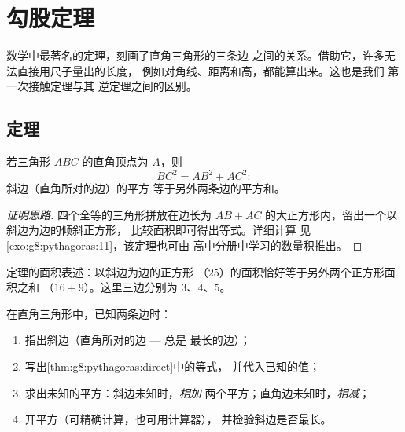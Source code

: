 \chapter{勾股定理}\label{ch:g8:pythagoras}

数学中最著名的定理，刻画了直角三角形的三条边
之间的关系。借助它，许多无法直接用尺子量出的长度，
例如对角线、距离和高，都能算出来。这也是我们
第一次接触定理与其
逆定理之间的区别。

\section{定理}

\begin{theorem}[毕达哥拉斯]\label{thm:g8:pythagoras:direct}
若三角形 $ABC$ 的直角顶点为 $A$，则
\[
BC^2 = AB^2 + AC^2 :
\]
斜边（直角所对的边）的平方
等于另外两条边的平方和。
\end{theorem}

\begin{proof}[证明思路]
四个全等的三角形拼放在边长为
$AB + AC$ 的大正方形内，留出一个以斜边为边的倾斜正方形，
比较面积即可得出等式。详细计算
见\cref{exo:g8:pythagoras:11}，该定理也可由
高中分册中学习的数量积推出。
\end{proof}

\begin{omfigure}

{\small 定理的面积表述：以斜边为边的正方形
（$25$）的面积恰好等于另外两个正方形面积之和
（$16 + 9$）。这里三边分别为 $3$、$4$、$5$。}
\end{omfigure}

\begin{method}[求边长]\label{met:g8:pythagoras:compute}
在直角三角形中，已知两条边时：
\begin{enumerate}
  \item 指出斜边（直角所对的边 --- 总是
        最长的边）；
  \item 写出\cref{thm:g8:pythagoras:direct}中的等式，
        并代入已知的值；
  \item 求出未知的平方：斜边未知时，\emph{相加}
        两个平方；直角边未知时，\emph{相减}；
  \item 开平方（可精确计算，也可用计算器），
        并检验斜边是否最长。
\end{enumerate}
\end{method}

